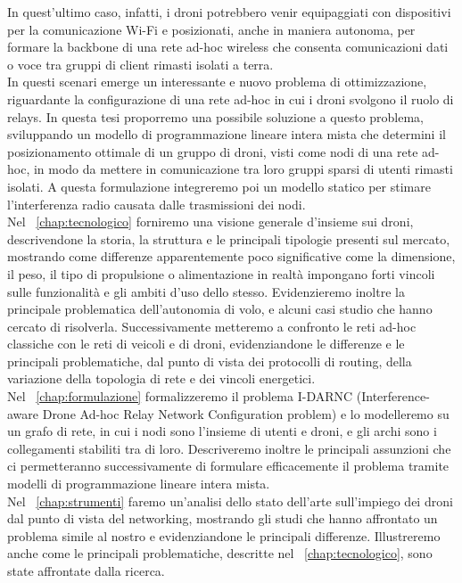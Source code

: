 In quest'ultimo caso, infatti, i droni potrebbero venir equipaggiati con dispositivi per la comunicazione Wi-Fi e posizionati, anche in maniera autonoma, per formare la backbone di una rete ad-hoc wireless che consenta comunicazioni dati o voce tra gruppi di client rimasti isolati a terra. \\
In questi scenari emerge un interessante e nuovo problema di ottimizzazione, riguardante la configurazione di una rete ad-hoc in cui i droni svolgono il ruolo di relays.
In questa tesi proporremo una possibile soluzione a questo problema, sviluppando un modello di programmazione lineare intera mista che determini il posizionamento ottimale di un gruppo di droni, visti come nodi di una rete ad-hoc, in modo da mettere in comunicazione tra loro gruppi sparsi di utenti rimasti isolati. A questa formulazione integreremo poi un modello statico per stimare l'interferenza radio causata dalle trasmissioni dei nodi. \\
Nel \chaptername\ \ref{chap:tecnologico} forniremo una visione generale d'insieme sui droni, descrivendone la storia, la struttura e le principali tipologie presenti sul mercato, mostrando come differenze apparentemente poco significative come la dimensione, il peso, il tipo di propulsione o alimentazione in realtà impongano forti vincoli sulle funzionalità e gli ambiti d'uso dello stesso. Evidenzieremo inoltre la principale problematica  dell'autonomia di volo, e alcuni casi studio che hanno cercato di risolverla.
Successivamente metteremo a confronto le reti ad-hoc classiche con le reti di veicoli e di droni, evidenziandone le differenze e le principali problematiche, dal punto di vista dei protocolli di routing, della variazione della topologia di rete e dei vincoli energetici.\\
Nel \chaptername\ \ref{chap:formulazione} formalizzeremo il problema I-DARNC (Interference-aware Drone Ad-hoc Relay Network Configuration problem) e lo modelleremo su un grafo di rete, in cui i nodi sono l'insieme di utenti e droni, e gli archi sono i collegamenti stabiliti tra di loro. Descriveremo inoltre le principali assunzioni che ci permetteranno successivamente di formulare efficacemente il problema tramite modelli di programmazione lineare intera mista. \\
Nel \chaptername\ \ref{chap:strumenti} faremo un'analisi dello stato dell'arte sull'impiego dei droni dal punto di vista del networking, mostrando gli studi che hanno affrontato un problema simile al nostro e evidenziandone le principali differenze. Illustreremo anche come le principali problematiche, descritte nel \chaptername\ \ref{chap:tecnologico}, sono state affrontate dalla ricerca. 
